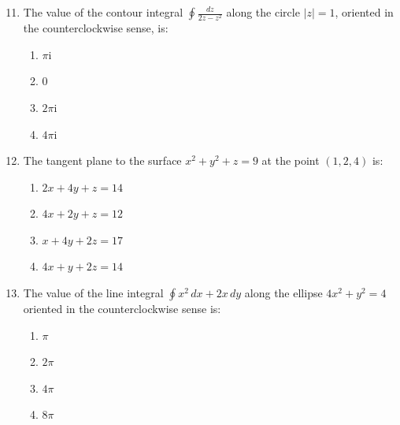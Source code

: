 \documentclass[journal]{IEEEtran}
\theoremstyle{remark}
\begin{document}
\begin{enumerate}[itemsep=1em]
\setcounter{enumi}{10}
\item The value of the contour integral $\oint \frac{dz}{2z - z^2}$ along the circle $\lvert z \rvert = 1$, oriented in the counterclockwise sense, is:
\begin{multicols}{4}
\begin{enumerate}
        \item $\pi$i
        \item $0$
        \item $2\pi$i
        \item $4\pi$i
\end{enumerate}
\end{multicols}

\end{enumerate}

\begin{enumerate}[itemsep=1em]
\setcounter{enumi}{11}
\item The tangent plane to the surface $x^2 + y^2 + z = 9$ at the point $(1, 2, 4)$ is:

\begin{enumerate}[leftmargin=2.5em, labelsep=0.5em, itemsep=0.5em]
        \item $2x+4y+z=14$
        \item $4x+2y+z=12$
        \item $x+4y+2z=17$
        \item $4x+y+2z=14$
\end{enumerate}
\end{enumerate}



\begin{enumerate}[itemsep=1em]
\setcounter{enumi}{12}
\item The value of the line integral $\oint x^2 \, dx + 2x \, dy$ along the ellipse $4x^2 + y^2 = 4$ oriented in the counterclockwise sense is:
\begin{multicols}{4}
\begin{enumerate}
        \item $\pi$
        \item $2\pi$
        \item $4\pi$
        \item $8\pi$
\end{enumerate}
\end{multicols}

\end{enumerate}
\end{document}
